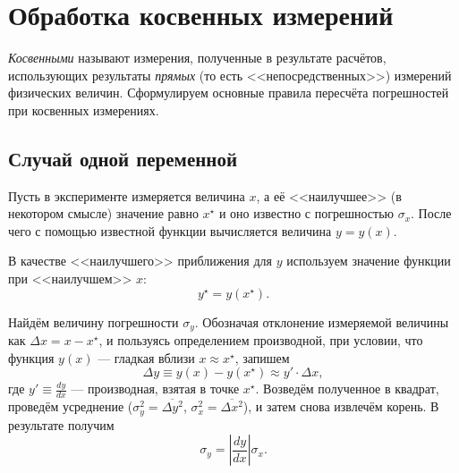 \section{Обработка косвенных измерений\label{sec:kosv}}

\emph{Косвенными} называют измерения, полученные в результате расчётов,
использующих результаты \emph{прямых} (то есть <<непосредственных>>)
измерений физических величин. Сформулируем основные правила пересчёта
погрешностей при косвенных измерениях.

\subsection{Случай одной переменной}

Пусть в эксперименте измеряется величина $x$, а её <<наилучшее>>
(в некотором смысле) значение равно $x^{\star}$ и оно известно с
погрешностью $\sigma_{x}$. После чего с помощью известной функции
вычисляется величина $y=y\!\left(x\right)$.

В качестве <<наилучшего>> приближения для
$y$ используем значение функции при <<наилучшем>>
$x$:
\[
y^{\star}=y\!\left(x^{\star}\right).
\]

Найдём величину погрешности $\sigma_{y}$. Обозначая отклонение измеряемой
величины как $\Delta x=x-x^{\star}$, и пользуясь определением производной,
при условии, что функция $y\left(x\right)$ --- гладкая
вблизи $x\approx x^{\star}$, запишем 
\[
\Delta y\equiv y\left(x\right)-y\left(x^{\star}\right)\approx y'\cdot\Delta x,
\]
где $y'\equiv\frac{dy}{dx}$ --- производная, взятая в точке
$x^{\star}$. Возведём полученное в квадрат, проведём усреднение ($\sigma_{y}^{2}=\overline{\Delta y^{2}}$,
$\sigma_{x}^{2}=\overline{\Delta x^{2}}$), и затем снова извлечём
корень. В результате получим
\begin{equation}
\boxed{{\sigma_{y}=\left|\frac{dy}{dx}\right|\sigma_{x}.}}\label{eq:sxy}
\end{equation}



